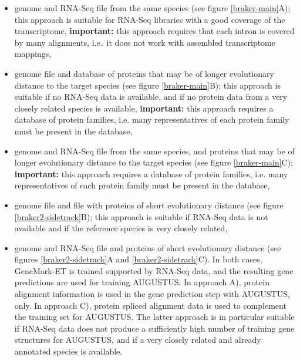 \documentclass[a4paper,10pt]{report}
\begin{document}
\begin{itemize}
 \item genome and RNA-Seq file from the same species (see figure \ref{braker-main}A); this approach is suitable for RNA-Seq libraries with a good coverage of the transcriptome, \textbf{important:} this approach requires that each intron is covered by many alignments, i.e.~it does not work with assembled transcriptome mappings,
 \item genome file and database of proteins that may be of longer evolutionary distance to the target species (see figure \ref{braker-main}B); this approach is suitable if no RNA-Seq data is available, and if no protein data from a very closely related species is available, \textbf{important:} this approach requires a database of protein families, i.e. many representatives of each protein family must be present in the database, 
 \item genome and RNA-Seq file from the same species, and proteins that may be of longer evolutionary distance to the target species (see figure \ref{braker-main}C); \textbf{important:} this approach requires a database of protein families, i.e. many representatives of each protein family must be present in the database,
 \item genome file and file with proteins of short evolutionary distance (see figure \ref{braker2-sidetrack}B); this approach is suitable if RNA-Seq data is not available and if the reference species is very closely related,
 \item genome and RNA-Seq file and proteins of short evolutionary distance (see figures \ref{braker2-sidetrack}A and \ref{braker2-sidetrack}C). In both cases, GeneMark-ET is trained supported by RNA-Seq data, and the resulting gene predictions are used for training AUGUSTUS. In approach A), protein alignment information is used in the gene prediction step with AUGUSTUS, only. In approach C), protein spliced alignment data is used to complement the training set for AUGUSTUS. The latter approach is in particular suitable if RNA-Seq data does not produce a sufficiently high number of training gene structures for AUGUSTUS, and if a very closely related and already annotated species is available.
\end{itemize}
\end{document}
